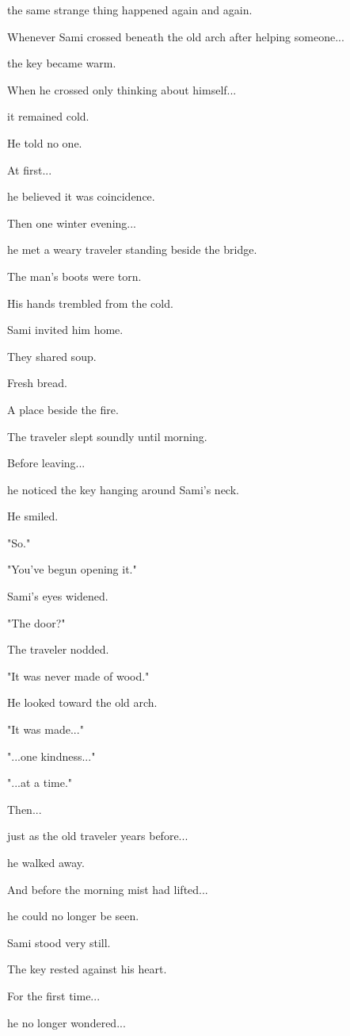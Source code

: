 \documentclass[12pt,openany]{book}
\begin{document}
the same strange thing happened again and again.

Whenever Sami crossed beneath the old arch after helping someone...

the key became warm.

When he crossed only thinking about himself...

it remained cold.

He told no one.

At first...

he believed it was coincidence.

Then one winter evening...

he met a weary traveler standing beside the bridge.

The man's boots were torn.

His hands trembled from the cold.

Sami invited him home.

They shared soup.

Fresh bread.

A place beside the fire.

The traveler slept soundly until morning.

Before leaving...

he noticed the key hanging around Sami's neck.

He smiled.

"So."

"You've begun opening it."

Sami's eyes widened.

"The door?"

The traveler nodded.

"It was never made of wood."

He looked toward the old arch.

"It was made..."

"...one kindness..."

"...at a time."

Then...

just as the old traveler years before...

he walked away.

And before the morning mist had lifted...

he could no longer be seen.

Sami stood very still.

The key rested against his heart.

For the first time...

he no longer wondered...
\end{document}
